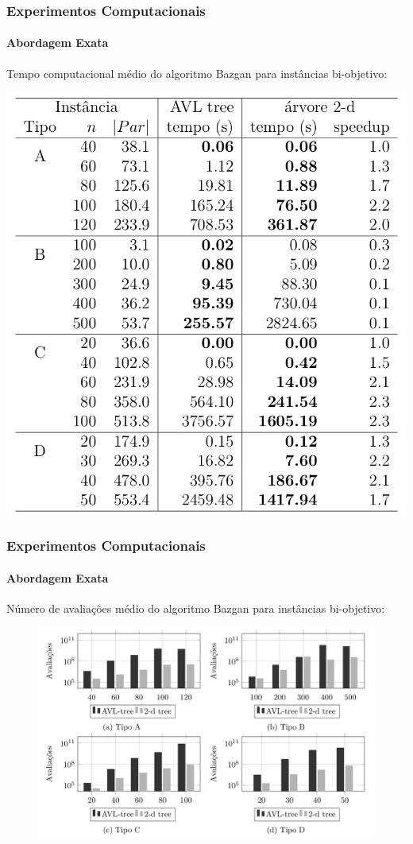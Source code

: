 \documentclass[10pt,xcolor=table,fleqn]{beamer}
\begin{document}
\begin{frame}
  \frametitle{Experimentos Computacionais}
  \framesubtitle{Abordagem Exata}
  Tempo computacional médio do algoritmo Bazgan para instâncias bi-objetivo:
  \scriptsize
  \begin{table}[h]
    \includegraphics[scale=0.3]{../tab/cpu2dim}
  \end{table}
\end{frame}

\begin{frame}
  \frametitle{Experimentos Computacionais}
  \framesubtitle{Abordagem Exata}
  Número de avaliações médio do algoritmo Bazgan para instâncias bi-objetivo:
  \begin{figure}[H]
    \includegraphics[scale=0.3]{../tab/cmp/2dim}
  \end{figure}
\end{frame}
\end{document}
